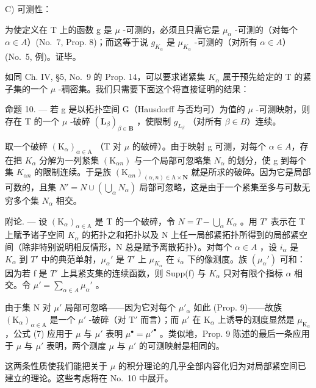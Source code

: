 C) 可测性：

为使定义在 T 上的函数 g 是 \(\mu\) -可测的，必须且只需它是 \(\mu_{\alpha}\) -可测的（对每个 \(\alpha \in A\)）(No.~7, Prop. 8)；而这等于说 \(g_{K_{\alpha}}\) 是 \(\mu_{K_{\alpha}}\) -可测的（对所有 \(\alpha \in A\)）(No.~5, 例)。证毕。

如同 Ch. IV, §5, No.~9 的 Prop. 14，可以要求诸紧集 \(K_{\alpha}\) 属于预先给定的 T 的紧子集的一个 \(\mu\) -稠密集。我们只需要下面这个将直接证明的结果：

命题 10. --- 若 g 是以拓扑空间 G（Hausdorff 与否均可）为值的 \(\mu\) -可测映射，则存在 T 的一个 \(\mu\) -破碎 \((\mathbf{L}_{\beta})_{\beta\in\mathbf{B}}\) ，使限制 \(g_{L_{\beta}}\) （对所有 \(\beta\in B\)）连续。

取一个破碎 \((\mathrm{K}_{\alpha})_{\alpha\in\mathrm{A}}\) （T 对 \(\mu\) 的破碎）。由于映射 g 可测，对每个 \(\alpha\in A\)，存在把 \(K_{\alpha}\) 分解为一列紧集 \((\mathrm{K}_{\alpha n})\) 与一个局部可忽略集 \(N_{\alpha}\) 的划分，使 g 到每个集 \(K_{\alpha n}\) 的限制连续。于是族 \((\mathrm{K}_{\alpha n})_{(\alpha,n)\in\mathrm{A}\times\mathbf{N}}\) 就是所求的破碎。因为它是局部可数的，且集 \(N' = N \cup \left( \bigcup_{\alpha} N_{\alpha} \right)\) 局部可忽略，这是由于一个紧集至多与可数无穷多个集 \(N_{\alpha}\) 相交。

附论. --- 设 \((\mathrm{K}_{\alpha})_{\alpha\in\mathrm{A}}\) 是 T 的一个破碎，令 \(N=T-\bigcup_{\alpha}K_{\alpha}\) 。用 \(T'\) 表示在 T 上赋予诸子空间 \(K_{\alpha}\) 的拓扑之和拓扑以及 N 上任一局部紧拓扑所得到的局部紧空间（除非特别说明相反情形，N 总是赋予离散拓扑）。对每个 \(\alpha \in A\) ，设 \(i_{\alpha}\) 是 \(K_{\alpha}\) 到 \(T'\) 中的典范单射，\(\mu_{\alpha}'\) 是 \(T'\) 上 \(\mu_{K_{\alpha}}\) 在 \(i_{\alpha}\) 下的像测度。族 \((\mu_{\alpha}')\) 可和：因为若 f 是 \(T'\) 上具紧支集的连续函数，则 Supp(f) 与 \(K_{\alpha}\) 只对有限个指标 \(\alpha\) 相交。令 \(\mu' = \sum_{\alpha \in A} \mu_{\alpha}'\) 。

由于集 N 对 \(\mu'\) 局部可忽略——因为它对每个 \(\mu'_{\alpha}\) 如此 (Prop. 9)——故族 \((\mathrm{K}_{\alpha})_{\alpha \in \mathrm{A}}\) 是一个 \(\mu'\) -破碎（对 \(\mathrm{T}'\) 而言）；而 \(\mu'\) 在 \(\mathrm{K}_{\alpha}\) 上诱导的测度显然是 \(\mu_{\mathrm{K}_{\alpha}}\)，公式 (7) 应用于 \(\mu\) 与 \(\mu'\) 表明 \(\mu^{\bullet} = \mu'^{\bullet}\) 。类似地，Prop. 9 陈述的最后一条应用于 \(\mu\) 与 \(\mu'\) 表明，两个测度 \(\mu\) 与 \(\mu'\) 的可测映射是相同的。

这两条性质使我们能把关于 \(\mu\) 的积分理论的几乎全部内容化归为对局部紧空间已建立的理论。这些考虑将在 No.~10 中展开。

